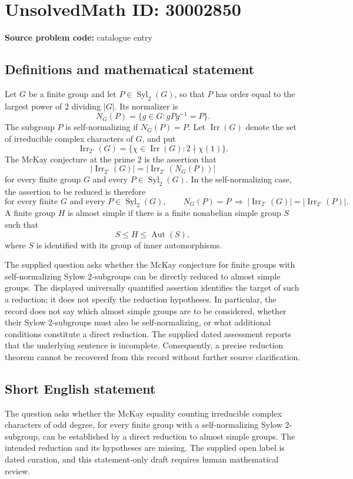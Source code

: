 \documentclass[11pt]{article}
\begin{document}
\section*{UnsolvedMath ID: 30002850}
\textbf{Source problem code:} catalogue entry
\subsection{Definitions and mathematical statement}
Let \(G\) be a finite group and let \(P\in\operatorname{Syl}_2(G)\), so that \(P\) has order equal to the largest power of \(2\) dividing \(|G|\). Its normalizer is
\[
N_G(P)=\{g\in G:gPg^{-1}=P\}.
\]
The subgroup \(P\) is self-normalizing if \(N_G(P)=P\). Let \(\operatorname{Irr}(G)\) denote the set of irreducible complex characters of \(G\), and put
\[
\operatorname{Irr}_{2'}(G)=\{\chi\in\operatorname{Irr}(G):2\nmid\chi(1)\}.
\]
The McKay conjecture at the prime \(2\) is the assertion that
\[
\bigl|\operatorname{Irr}_{2'}(G)\bigr|
=
\bigl|\operatorname{Irr}_{2'}(N_G(P))\bigr|
\]
for every finite group \(G\) and every \(P\in\operatorname{Syl}_2(G)\). In the self-normalizing case, the assertion to be reduced is therefore
\[
\text{for every finite }G\text{ and every }P\in\operatorname{Syl}_2(G),\qquad
N_G(P)=P\ \Longrightarrow\
\bigl|\operatorname{Irr}_{2'}(G)\bigr|
=
\bigl|\operatorname{Irr}_{2'}(P)\bigr|.
\]
A finite group \(H\) is almost simple if there is a finite nonabelian simple group \(S\) such that
\[
S\leq H\leq\operatorname{Aut}(S),
\]
where \(S\) is identified with its group of inner automorphisms.

The supplied question asks whether the McKay conjecture for finite groups with self-normalizing Sylow \(2\)-subgroups can be directly reduced to almost simple groups. The displayed universally quantified assertion identifies the target of such a reduction; it does not specify the reduction hypotheses. In particular, the record does not say which almost simple groups are to be considered, whether their Sylow \(2\)-subgroups must also be self-normalizing, or what additional conditions constitute a direct reduction. The supplied dated assessment reports that the underlying sentence is incomplete. Consequently, a precise reduction theorem cannot be recovered from this record without further source clarification.
\subsection{Short English statement}
The question asks whether the McKay equality counting irreducible complex characters of odd degree, for every finite group with a self-normalizing Sylow \(2\)-subgroup, can be established by a direct reduction to almost simple groups. The intended reduction and its hypotheses are missing. The supplied open label is dated curation, and this statement-only draft requires human mathematical review.
\end{document}
